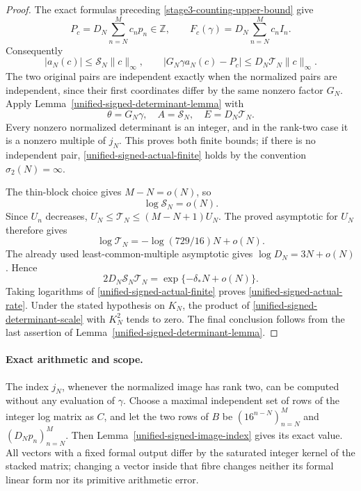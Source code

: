 \documentclass[11pt,a4paper]{article}
\theoremstyle{definition}
\theoremstyle{remark}
\begin{document}
\begin{proof}
The exact formulas preceding
\eqref{stage3-counting-upper-bound} give
\[
 P_c=D_N\sum_{n=N}^M c_np_n\in\mathbb Z,
 \qquad F_c(\gamma)=D_N\sum_{n=N}^M c_nI_n.
\]
Consequently
\[
 |a_N(c)|\le\mathcal S_N\|c\|_\infty,
 \qquad
 |G_N\gamma a_N(c)-P_c|
 \le D_N\mathcal T_N\|c\|_\infty.
\]
The two original pairs are independent exactly when the normalized
pairs are independent, since their first coordinates differ by
the same nonzero factor $G_N$.
Apply Lemma~\ref{unified-signed-determinant-lemma} with
\[
 \theta=G_N\gamma,\quad A=\mathcal S_N,
 \quad E=D_N\mathcal T_N.
\]
Every nonzero normalized determinant is an integer, and in the
rank-two case it is a nonzero multiple of $j_N$.
This proves both finite bounds; if there is no independent pair,
\eqref{unified-signed-actual-finite} holds by the convention
$\sigma_2(N)=\infty$.

The thin-block choice gives $M-N=o(N)$, so
\[
 \log\mathcal S_N=o(N).
\]
Since $U_n$ decreases,
$U_N\le\mathcal T_N\le(M-N+1)U_N$.  The proved asymptotic for
$U_N$ therefore gives
\[
 \log\mathcal T_N=-\log(729/16)N+o(N).
\]
The already used least-common-multiple asymptotic gives
$\log D_N=3N+o(N)$.  Hence
\begin{equation}\label{unified-signed-determinant-scale}
 2D_N\mathcal S_N\mathcal T_N
 =\exp\{-\delta_*N+o(N)\}.
\end{equation}
Taking logarithms of \eqref{unified-signed-actual-finite}
proves \eqref{unified-signed-actual-rate}.
Under the stated hypothesis on $K_N$, the product of
\eqref{unified-signed-determinant-scale} with $K_N^2$ tends to zero.
The final conclusion follows from the last assertion of
Lemma~\ref{unified-signed-determinant-lemma}.
\end{proof}

\paragraph{Exact arithmetic and scope.}
The index $j_N$, whenever the normalized image has rank two, can be
computed without any evaluation of $\gamma$.
Choose a maximal independent set of rows of the integer log matrix
as $C$, and let the two rows of $B$ be
$(16^{n-N})_{n=N}^M$ and $(D_Np_n)_{n=N}^M$.
Then Lemma~\ref{unified-signed-image-index} gives its exact value.
All vectors with a fixed formal output differ by the saturated
integer kernel of the stacked matrix; changing a vector inside
that fibre changes neither its formal linear form nor its
primitive arithmetic error.
\end{document}
